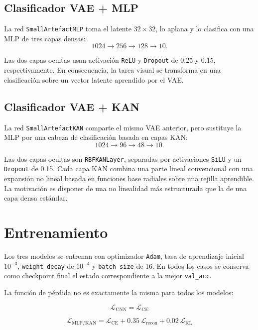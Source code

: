 \documentclass[11pt,a4paper]{report}
\begin{document}
\subsection{Clasificador VAE + MLP}

La red \texttt{SmallArtefactMLP} toma el latente $32\times32$, lo aplana y lo clasifica con una MLP de tres capas densas:
\[
1024 \rightarrow 256 \rightarrow 128 \rightarrow 10.
\]

Las dos capas ocultas usan activaci\'on \texttt{ReLU} y \texttt{Dropout} de 0.25 y 0.15, respectivamente. En consecuencia, la tarea visual se transforma en una clasificaci\'on sobre un vector latente aprendido por el VAE.

\subsection{Clasificador VAE + KAN}

La red \texttt{SmallArtefactKAN} comparte el mismo VAE anterior, pero sustituye la MLP por una cabeza de clasificaci\'on basada en capas KAN:
\[
1024 \rightarrow 96 \rightarrow 48 \rightarrow 10.
\]

Las dos capas ocultas son \texttt{RBFKANLayer}, separadas por activaciones \texttt{SiLU} y un \texttt{Dropout} de 0.15. Cada capa KAN combina una parte lineal convencional con una expansi\'on no lineal basada en funciones base radiales sobre una rejilla aprendible. La motivaci\'on es disponer de una no linealidad m\'as estructurada que la de una capa densa est\'andar.

\section{Entrenamiento}

Los tres modelos se entrenan con optimizador \texttt{Adam}, tasa de aprendizaje inicial $10^{-3}$, \texttt{weight decay} de $10^{-4}$ y \texttt{batch size} de 16. En todos los casos se conserva como checkpoint final el estado correspondiente a la mejor \texttt{val\_acc}.

La funci\'on de p\'erdida no es exactamente la misma para todos los modelos:

\begin{equation}
\mathcal{L}_{\text{CNN}} = \mathcal{L}_{\text{CE}}
\end{equation}

\begin{equation}
\mathcal{L}_{\text{MLP/KAN}} = \mathcal{L}_{\text{CE}} + 0.35\,\mathcal{L}_{\text{recon}} + 0.02\,\mathcal{L}_{\text{KL}}
\end{equation}
\end{document}
